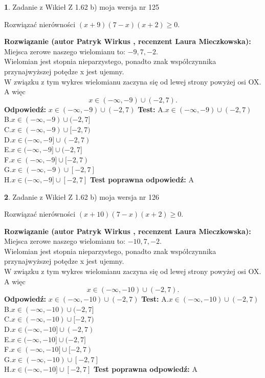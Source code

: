 \documentclass[12pt, a4paper]{article}
\theoremstyle{definition} %
\newtheorem{zad}{}
\newcommand{\zadStart}[1]{\begin{zad}#1\newline}
\newcommand{\zadStop}{\end{zad}}
\newcommand{\rozwStart}[2]{\noindent \textbf{Rozwiązanie (autor #1 , recenzent #2): }\newline}
\newcommand{\rozwStop}{\newline}
\newcommand{\odpStart}{\noindent \textbf{Odpowiedź:}\newline}
\newcommand{\odpStop}{\newline}
\newcommand{\testStart}{\noindent \textbf{Test:}\newline}
\newcommand{\testStop}{\newline}
\newcommand{\kluczStart}{\noindent \textbf{Test poprawna odpowiedź:}\newline}
\newcommand{\kluczStop}{\newline}
\begin{document}
\zadStart{Zadanie z Wikieł Z 1.62 b) moja wersja nr 125}

Rozwiązać nierówności $(x+9)(7-x)(x+2)\ge0$.
\zadStop
\rozwStart{Patryk Wirkus}{Laura Mieczkowska}
Miejsca zerowe naszego wielomianu to: $-9, 7, -2$.\\
Wielomian jest stopnia nieparzystego, ponadto znak współczynnika przy\linebreak najwyższej potędze x jest ujemny.\\ W związku z tym wykres wielomianu zaczyna się od lewej strony powyżej osi OX. A więc $$x \in (-\infty,-9) \cup (-2,7).$$
\rozwStop
\odpStart
$x \in (-\infty,-9) \cup (-2,7)$
\odpStop
\testStart
A.$x \in (-\infty,-9) \cup (-2,7)$\\
B.$x \in (-\infty,-9) \cup (-2,7]$\\
C.$x \in (-\infty,-9) \cup [-2,7)$\\
D.$x \in (-\infty,-9] \cup (-2,7)$\\
E.$x \in (-\infty,-9] \cup (-2,7]$\\
F.$x \in (-\infty,-9] \cup [-2,7)$\\
G.$x \in (-\infty,-9) \cup [-2,7]$\\
H.$x \in (-\infty,-9] \cup [-2,7]$
\testStop
\kluczStart
A
\kluczStop



\zadStart{Zadanie z Wikieł Z 1.62 b) moja wersja nr 126}

Rozwiązać nierówności $(x+10)(7-x)(x+2)\ge0$.
\zadStop
\rozwStart{Patryk Wirkus}{Laura Mieczkowska}
Miejsca zerowe naszego wielomianu to: $-10, 7, -2$.\\
Wielomian jest stopnia nieparzystego, ponadto znak współczynnika przy\linebreak najwyższej potędze x jest ujemny.\\ W związku z tym wykres wielomianu zaczyna się od lewej strony powyżej osi OX. A więc $$x \in (-\infty,-10) \cup (-2,7).$$
\rozwStop
\odpStart
$x \in (-\infty,-10) \cup (-2,7)$
\odpStop
\testStart
A.$x \in (-\infty,-10) \cup (-2,7)$\\
B.$x \in (-\infty,-10) \cup (-2,7]$\\
C.$x \in (-\infty,-10) \cup [-2,7)$\\
D.$x \in (-\infty,-10] \cup (-2,7)$\\
E.$x \in (-\infty,-10] \cup (-2,7]$\\
F.$x \in (-\infty,-10] \cup [-2,7)$\\
G.$x \in (-\infty,-10) \cup [-2,7]$\\
H.$x \in (-\infty,-10] \cup [-2,7]$
\testStop
\kluczStart
A
\kluczStop
\end{document}
